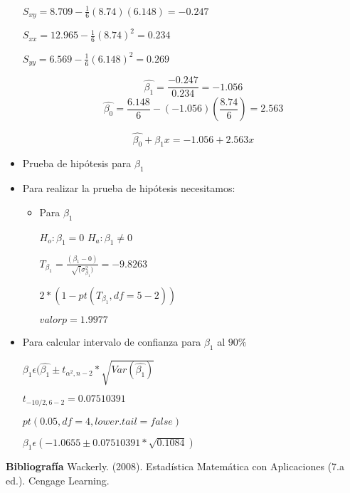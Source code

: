 \documentclass{../oxmathproblems}
\begin{document}
\begin{questions}
\begin{itemize}
$ S_{xy} = 8.709 - \frac{1}{6}(8.74)(6.148) = - 0.247 $ 

$ S_{xx} = 12.965 - \frac{1}{6}(8.74)^2 = 0.234 $ 

$ S_{yy} = 6.569 - \frac{1}{6}(6.148)^2 = 0.269 $ 

$$ \hat{\beta_1} = \frac{- 0.247}{0.234} = -1.056  $$ 
$$ \hat{\beta_0} =\frac{6.148}{6} - (-1.056)(\frac{8.74}{6}) = 2.563 $$ 


$$ \hat{\beta_0} + \hat{\beta_1}x =  -1.056 + 2.563x $$  

\item Prueba de hipótesis para $\beta_1$ 

\item Para realizar la prueba de hipótesis necesitamos: 
\begin{itemize}
\item Para $\beta_1$ 


$ H_o:\beta_1 = 0 $  $ H_a:\beta_1 \neq 0 $ 



$ T_{\beta_1}= \frac{(\beta{_1}-0)}{\sqrt(\sigma^2_{\beta_1})} =  -9.8263 $ 


$ 2*(1-pt(T_{\beta_1}, df = 5-2)) $ 


$ valor p = 1.9977 $ 

\end{itemize}

\item Para calcular intervalo de confianza para $\beta_1$ al $90\%$


$ \beta_1  \epsilon  ( \hat{\beta_1} \pm t_{\alpha^2,n-2} * \sqrt{Var(\hat{\beta_1})} $  


$ t_{-10/2,6-2} = 0.07510391$ 

$pt(0.05,df = 4, lower.tail= false)$ 



$ \beta_1  \epsilon (-1.0655 \pm 0.07510391 * \sqrt{0.1084} ) $ 

\end{itemize}


\textbf{Bibliografía}
Wackerly. (2008). Estadística Matemática con Aplicaciones (7.a ed.). Cengage Learning.


\end{questions}
\end{document}
